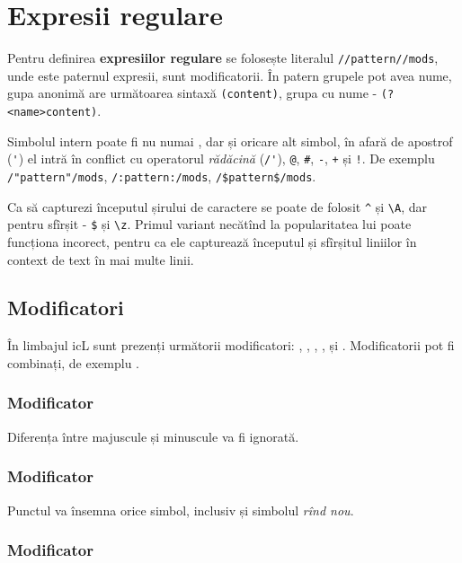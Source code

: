 \section{Expresii regulare}
\label{regex}

Pentru definirea {\bf expresiilor regulare} se folosește literalul \lstinline|//pattern//mods|, unde  este paternul expresii,  sunt modificatorii. În patern grupele pot avea nume, gupa anonimă are următoarea sintaxă \lstinline|(content)|, grupa cu nume - \lstinline|(?<name>content)|.

Simbolul intern poate fi nu numai \code{/}, dar și oricare alt simbol, în afară de apostrof (\lstinline|'|) el intră în conflict cu operatorul {\it rădăcină} (\lstinline|/'|), \lstinline|@|, \lstinline|#|, \lstinline|-|, \lstinline|+| și \lstinline|!|. De exemplu  \lstinline|/"pattern"/mods|, \lstinline|/:pattern:/mods|, \lstinline|/$pattern$/mods|.

Ca să capturezi începutul șirului de caractere se poate de folosit \lstinline|^| și \lstinline|\A|, dar pentru sfîrșit - \lstinline|$| și \lstinline|\z|. Primul variant necătînd la popularitatea lui poate funcționa incorect, pentru ca ele capturează începutul și sfîrșitul liniilor în context de text în mai multe linii.

\subsection{Modificatori}

În limbajul icL sunt prezenți următorii modificatori: , , , ,  și . Modificatorii pot fi combinați, de exemplu .

\subsubsection{Modificator }

Diferența între majuscule și minuscule va fi ignorată. 

\subsubsection{Modificator }

Punctul va însemna orice simbol, inclusiv și simbolul {\it rînd nou}.

\subsubsection{Modificator }

